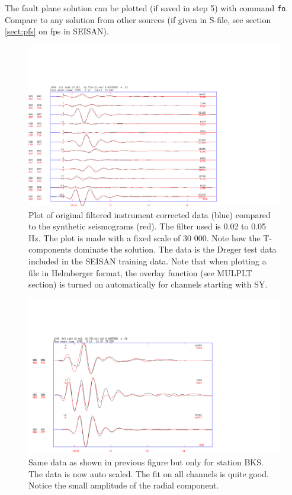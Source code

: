 The fault plane solution can be plotted (if saved in step 5) with command \texttt{fo}. Compare to any solution from other sources (if given in S-file, see section \ref{sect:pfs} on fps in SEISAN).

\begin{figure}
\centerline{\includegraphics[width=0.9\linewidth]{fig/mt-dreger-1}}
\caption{Plot of original filtered instrument corrected data (blue) compared to the synthetic seismograms (red). The filter used is 0.02 to 0.05 Hz. The plot is made with a fixed scale of 30 000. Note how the T-components dominate the solution. The data is the Dreger test data included in the SEISAN training data. Note that when plotting a file in Helmberger format, the overlay function (see MULPLT section) is turned on automatically for channels starting with SY. }
\label{fig:mt-dreger-1}
\end{figure}

\begin{figure}
\centerline{\includegraphics[width=0.9\linewidth]{fig/mt-dreger-2}}
\caption{Same data as shown in previous figure but only for station BKS. The data is now auto scaled. The fit on all channels is quite good. Notice the small amplitude of the radial component.}
\label{fig:mt-dreger-2}
\end{figure}

